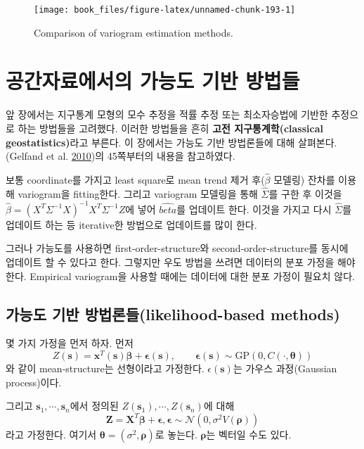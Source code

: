 \documentclass[b5paper,]{book}
\theoremstyle{definition}
\theoremstyle{definition}
\theoremstyle{definition}
\theoremstyle{remark}
\begin{document}
\begin{figure}

{\centering \texttt{[image: book\_files/figure-latex/unnamed-chunk-193-1]} 

}

\caption{Comparison of variogram estimation methods.}\label{fig:unnamed-chunk-193}
\end{figure}

\chapter{공간자료에서의 가능도 기반 방법들}\label{spatlikelihood}

앞 장에서는 지구통계 모형의 모수 추정을 적률 추정 또는 최소자승법에
기반한 추정으로 하는 방법들을 고려했다. 이러한 방법들을 흔히
\textbf{고전 지구통계학(classical geostatistics)}라고 부른다. 이
장에서는 가능도 기반 방법론들에 대해 살펴본다. (Gelfand et al.
\protect\hyperlink{ref-Gelfand2010}{2010})의 45쪽부터의 내용을
참고하였다.

보통 coordinate를 가지고 least square로 mean trend 제거
후(\(\hat{\beta}\) 모델링) 잔차를 이용해 variogram을 fitting한다. 그리고
variogram 모델링을 통해 \(\hat{\Sigma}\)를 구한 후 이것을
\(\hat{\beta}=(X^{T}\Sigma^{-1}X)^{-1}X^{T}\Sigma^{-1}Z\)에 넣어
\(\hat{beta}\)를 업데이트 한다. 이것을 가지고 다시 \(\hat{\Sigma}\)를
업데이트 하는 등 iterative한 방법으로 업데이트를 많이 한다.

그러나 가능도를 사용하면 first-order-structure와
second-order-structure를 동시에 업데이트 할 수 있다고 한다. 그렇지만
우도 방법을 쓰려면 데이터의 분포 가정을 해야 한다. Empirical variogram을
사용할 때에는 데이터에 대한 분포 가정이 필요치 않다.

\section{가능도 기반 방법론들(likelihood-based
methods)}\label{--likelihood-based-methods}

몇 가지 가정을 먼저 하자. 먼저
\[Z(\mathbf{s})=\mathbf{x}^{T}(\mathbf{s})\boldsymbol{\beta}+\boldsymbol{\epsilon}(\mathbf{s}), \qquad{\boldsymbol{\epsilon}(\mathbf{s}) \sim  \text{GP}(0, C(\cdot, \boldsymbol{\theta}))}\]
와 같이 mean-structure는 선형이라고 가정한다. \(\epsilon(\mathbf{s})\)는
가우스 과정(Gaussian process)이다.

그리고 \(\mathbf{s}_{1}, \cdots , \mathbf{s}_{n}\)에서 정의된
\(Z(\mathbf{s}_{1}), \cdots , Z(\mathbf{s}_{n})\)에 대해
\[\mathbf{Z}=\mathbf{X}^{T}\boldsymbol{\beta}+\boldsymbol{\epsilon}, \boldsymbol{\epsilon} \sim \mathcal{N}(0, \sigma^{2}V(\boldsymbol{\rho}))\]
라고 가정한다. 여기서
\(\boldsymbol{\theta}=(\sigma^{2}, \boldsymbol{\rho})\)로 놓는다.
\(\boldsymbol{\rho}\)는 벡터일 수도 있다.
\end{document}
